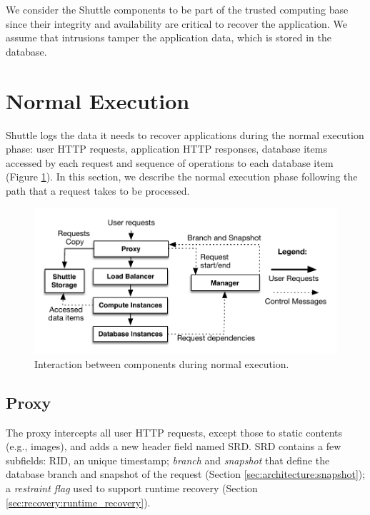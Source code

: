 We consider the Shuttle components to be part of the trusted computing base since their integrity and availability are critical to recover the application. We assume that intrusions tamper the application data, which is stored in the database.





\section{Normal Execution}
\label{sec:architecture:normal_execution}

Shuttle logs the data it needs to recover applications during the normal execution phase: user HTTP requests, application HTTP responses, database items accessed by each request and sequence of operations to each database item (Figure \ref{fig:normal_execution}). In this section, we describe the normal execution phase following the path that a request takes to be processed.

\begin{figure}
  \centering
  \includegraphics[width=0.9\linewidth]{images/normalExecution}
  \caption{Interaction between components during normal execution.}
  \label{fig:normal_execution}
\end{figure}


\subsection{Proxy}
\label{sec:architecture:proxy}

The proxy intercepts all user HTTP requests, except those to static contents (e.g., images), and adds a new header field named \acf{SRD}. \ac{SRD} contains a few subfields: \acf{RID}, an unique timestamp; \emph{branch} and \emph{snapshot} that define the database branch and snapshot of the request (Section \ref{sec:architecture:snapshot}); a \emph{restraint flag} used to support runtime recovery (Section \ref{sec:recovery:runtime_recovery}). 

